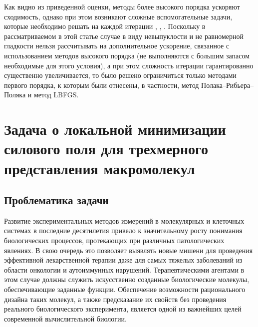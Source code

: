   Как видно из приведенной оценки, методы более высокого порядка ускоряют сходимость, однако при этом возникают сложные вспомогательные задачи, которые необходимо решать на каждой итерации 
  \cite{gasnikov2018global}, \cite{nesterov2018implementable}, \cite{monteiro2013accelerated}. Поскольку в рассматриваемом в этой статье случае в виду невыпуклости и не равномерной гладкости нельзя рассчитывать на дополнительное ускорение, связанное с использованием методов высокого порядка (не выполняются с большим запасом необходимые для этого условия), а при этом сложность итерации гарантированно существенно увеличивается, то было решено ограничиться только методами первого порядка, к которым были отнесены, в частности, метод Полака--Рибьера--Поляка и метод LBFGS.
  \fi


\section{Задача о локальной минимизации силового поля для трехмерного представления макромолекул} \label{sec:ch1/sec2}

\subsection{Проблематика задачи} \label{subsec:sec1/su1}
  Развитие экспериментальных методов измерений в молекулярных и клеточных системах в последние десятилетия привело к значительному росту понимания биологических процессов, протекающих при различных патологических явлениях.
  В свою очередь это позволяет выявлять новые мишени для проведения эффективной лекарственной терапии даже для самых тяжелых заболеваний из области онкологии и аутоиммунных нарушений.
  Терапевтическими агентами в этом случае должны служить искусственно созданные биологические молекулы, обеспечивающие заданные функции.
  Обеспечение возможности рационального дизайна таких молекул, а также предсказание их свойств без проведения реального биологического эксперимента, является одной из важнейших целей современной вычислительной биологии.

